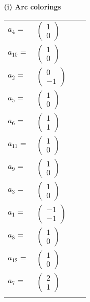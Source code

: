 \documentclass[1p]{elsarticle_modified}
\theoremstyle{definition}
\begin{document}
\flushleft \textbf{(i) Arc colorings}\\
\begin{tabular}{m{7pt} m{180pt} m{7pt} m{180pt} }
\flushright $a_{4}=$&$\begin{pmatrix}1\\0\end{pmatrix}$ \\
\flushright $a_{10}=$&$\begin{pmatrix}1\\0\end{pmatrix}$ \\
\flushright $a_{2}=$&$\begin{pmatrix}0\\-1\end{pmatrix}$ \\
\flushright $a_{5}=$&$\begin{pmatrix}1\\0\end{pmatrix}$ \\
\flushright $a_{6}=$&$\begin{pmatrix}1\\1\end{pmatrix}$ \\
\flushright $a_{11}=$&$\begin{pmatrix}1\\0\end{pmatrix}$ \\
\flushright $a_{9}=$&$\begin{pmatrix}1\\0\end{pmatrix}$ \\
\flushright $a_{3}=$&$\begin{pmatrix}1\\0\end{pmatrix}$ \\
\flushright $a_{1}=$&$\begin{pmatrix}-1\\-1\end{pmatrix}$ \\
\flushright $a_{8}=$&$\begin{pmatrix}1\\0\end{pmatrix}$ \\
\flushright $a_{12}=$&$\begin{pmatrix}1\\0\end{pmatrix}$ \\
\flushright $a_{7}=$&$\begin{pmatrix}2\\1\end{pmatrix}$\\&\end{tabular}
\end{document}
